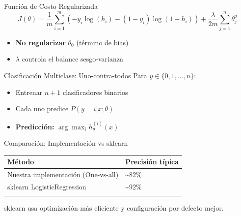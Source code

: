 \documentclass[
  ignorenonframetext,
]{beamer}
\providecommand{\tightlist}{%
  \setlength{\itemsep}{0pt}\setlength{\parskip}{0pt}}
\begin{document}
\begin{frame}
\begin{block}{Función de Costo Regularizada}
\label{funciuxf3n-de-costo-regularizada}
\[J(\theta) = \frac{1}{m}\sum_{i=1}^m\left(-y_i \log(h_i) - (1-y_i)\log(1-h_i)\right) + \frac{\lambda}{2m}\sum_{j=1}^n\theta_j^2\]

\begin{itemize}
\tightlist
\item
  \textbf{No regularizar} \(\theta_0\) (término de bias)
\item
  \(\lambda\) controla el balance sesgo-varianza
\end{itemize}
\end{block}
\end{frame}

\begin{frame}
\begin{block}{Clasificación Multiclase: Uno-contra-todos}
\label{clasificaciuxf3n-multiclase-uno-contra-todos}
Para \(y \in \{0, 1, ..., n\}\):

\begin{itemize}
\tightlist
\item
  Entrenar \(n+1\) clasificadores binarios
\item
  Cada uno predice \(P(y = i | x; \theta)\)
\item
  \textbf{Predicción:} \(\arg\max_i h_\theta^{(i)}(x)\)
\end{itemize}
\end{block}
\end{frame}

\begin{frame}
\begin{block}{Comparación: Implementación vs sklearn}
\label{comparaciuxf3n-implementaciuxf3n-vs-sklearn}
\begin{longtable}[]{@{}ll@{}}
\toprule\noalign{}
Método & Precisión típica \\
\midrule\noalign{}
\endhead
Nuestra implementación (One-vs-all) & \textasciitilde82\% \\
sklearn LogisticRegression & \textasciitilde92\% \\
\bottomrule\noalign{}
\end{longtable}

sklearn usa optimización más eficiente y configuración por defecto
mejor.
\end{block}
\end{frame}
\end{document}
